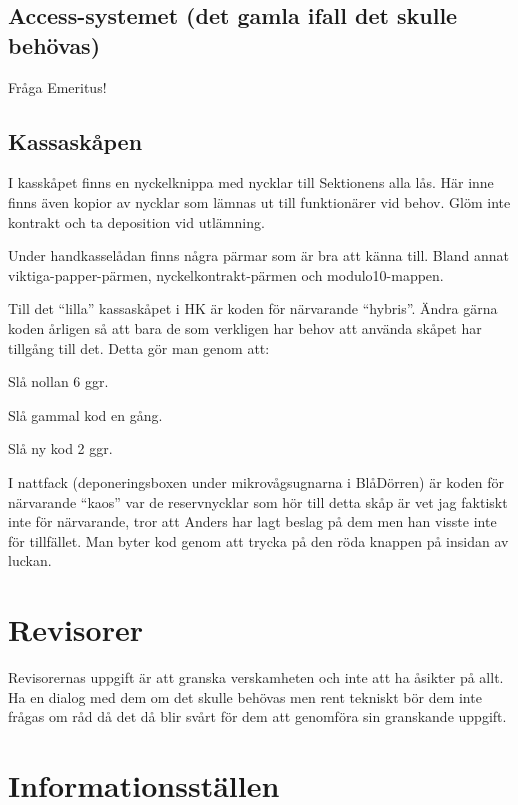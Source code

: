 \documentclass[10pt]{article}
\begin{document}
    \subsection{Access-systemet (det gamla ifall det skulle behövas)}
    
    Fråga Emeritus!
    
    \subsection{Kassaskåpen}
    
    I kasskåpet finns en nyckelknippa med nycklar till Sektionens alla lås. Här inne finns även kopior av nycklar som lämnas ut till funktionärer vid behov. Glöm inte kontrakt och ta deposition vid utlämning.
    
    Under handkasselådan finns några pärmar som är bra att känna till. Bland annat viktiga-papper-pärmen, nyckelkontrakt-pärmen och modulo10-mappen.
    
    Till det ``lilla'' kassaskåpet i HK är koden för närvarande ``hybris''. Ändra gärna koden årligen så att bara de som verkligen har behov att använda skåpet har tillgång till det. Detta gör man genom att:
    
    \begin{numplist}
    \item Slå nollan 6 ggr.
    \item Slå gammal kod en gång.
    \item Slå ny kod 2 ggr.
    \end{numplist}
    
    I nattfack (deponeringsboxen under mikrovågsugnarna i BlåDörren) är koden för närvarande ``kaos'' var de reservnycklar som hör till detta skåp är vet jag faktiskt inte för närvarande, tror att Anders har lagt beslag på dem men han visste inte för tillfället. Man byter kod genom att trycka på den röda knappen på insidan av luckan.
    
    \section{Revisorer}
    
    Revisorernas uppgift är att granska verskamheten och inte att ha åsikter på allt. Ha en dialog med dem om det skulle behövas men rent tekniskt bör dem inte frågas om råd då det då blir svårt för dem att genomföra sin granskande uppgift.
    
    \section{Informationsställen}
    
\end{document}
